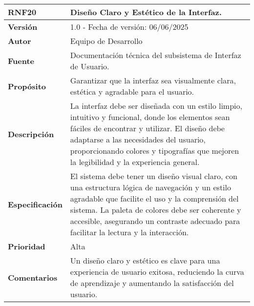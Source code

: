 \begin{longtable}{|l|p{12cm}|}
\hline
\textbf{RNF20} & \textbf{Diseño Claro y Estético de la Interfaz.} \\
\hline
\endfirsthead
\hline
\textbf{Versión} & 1.0 - Fecha de versión: 06/06/2025 \\
\hline
\textbf{Autor} & Equipo de Desarrollo \\
\hline
\textbf{Fuente} & Documentación técnica del subsistema de Interfaz de Usuario. \\
\hline
\textbf{Propósito} & Garantizar que la interfaz sea visualmente clara, estética y agradable para el usuario. \\
\hline
\textbf{Descripción} & La interfaz debe ser diseñada con un estilo limpio, intuitivo y funcional, donde los elementos sean fáciles de encontrar y utilizar. El diseño debe adaptarse a las necesidades del usuario, proporcionando colores y tipografías que mejoren la legibilidad y la experiencia general. \\
\hline
\textbf{Especificación} & El sistema debe tener un diseño visual claro, con una estructura lógica de navegación y un estilo agradable que facilite el uso y la comprensión del sistema. La paleta de colores debe ser coherente y accesible, asegurando un contraste adecuado para facilitar la lectura y la interacción. \\
\hline
\textbf{Prioridad} & Alta \\
\hline
\textbf{Comentarios} & Un diseño claro y estético es clave para una experiencia de usuario exitosa, reduciendo la curva de aprendizaje y aumentando la satisfacción del usuario. \\
\hline
\end{longtable}